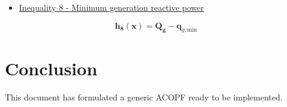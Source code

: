 \documentclass{article}
\begin{document}
\begin{itemize}
    \item \underline{Inequality 8 - Minimum generation reactive power}
\end{itemize}
\begin{equation}
    \bm{h_8}(\bm{x}) = \bm{Q_g} - \bm{q}_{g,\text{min}}
\end{equation}



\section{Conclusion}

This document has formulated a generic ACOPF ready to be implemented. 

\end{document}
